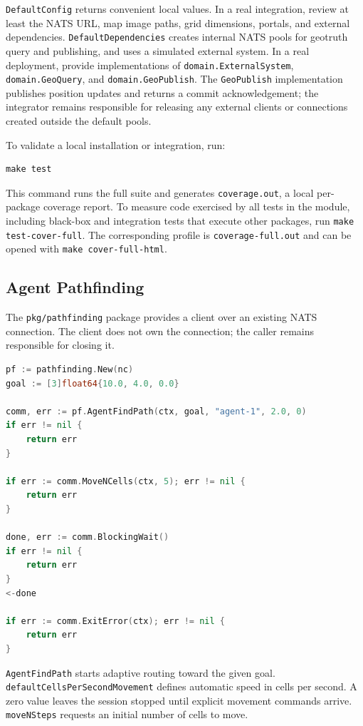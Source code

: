 \documentclass[12pt,a4paper]{report}
\begin{document}
\texttt{DefaultConfig} returns convenient local values. In a real integration,
review at least the NATS URL, map image paths, grid dimensions, portals, and
external dependencies. \texttt{DefaultDependencies} creates internal NATS pools
for geotruth query and publishing, and uses a simulated external system. In a
real deployment, provide implementations of \texttt{domain.ExternalSystem},
\texttt{domain.GeoQuery}, and \texttt{domain.GeoPublish}. The
\texttt{GeoPublish} implementation publishes position updates and returns a
commit acknowledgement; the integrator remains responsible for releasing any
external clients or connections created outside the default pools.

To validate a local installation or integration, run:

\begin{lstlisting}
make test
\end{lstlisting}

This command runs the full suite and generates \texttt{coverage.out}, a local
per-package coverage report. To measure code exercised by all tests in the
module, including black-box and integration tests that execute other packages,
run \texttt{make test-cover-full}. The corresponding profile is
\texttt{coverage-full.out} and can be opened with \texttt{make cover-full-html}.

\subsection{Agent Pathfinding}

The \texttt{pkg/pathfinding} package provides a client over an existing NATS
connection. The client does not own the connection; the caller remains
responsible for closing it.

\begin{lstlisting}[language=Go]
pf := pathfinding.New(nc)
goal := [3]float64{10.0, 4.0, 0.0}

comm, err := pf.AgentFindPath(ctx, goal, "agent-1", 2.0, 0)
if err != nil {
    return err
}

if err := comm.MoveNCells(ctx, 5); err != nil {
    return err
}

done, err := comm.BlockingWait()
if err != nil {
    return err
}
<-done

if err := comm.ExitError(ctx); err != nil {
    return err
}
\end{lstlisting}

\texttt{AgentFindPath} starts adaptive routing toward the given goal.
\texttt{defaultCellsPerSecondMovement} defines automatic speed in cells per
second. A zero value leaves the session stopped until explicit movement commands
arrive. \texttt{moveNSteps} requests an initial number of cells to move.
\end{document}
